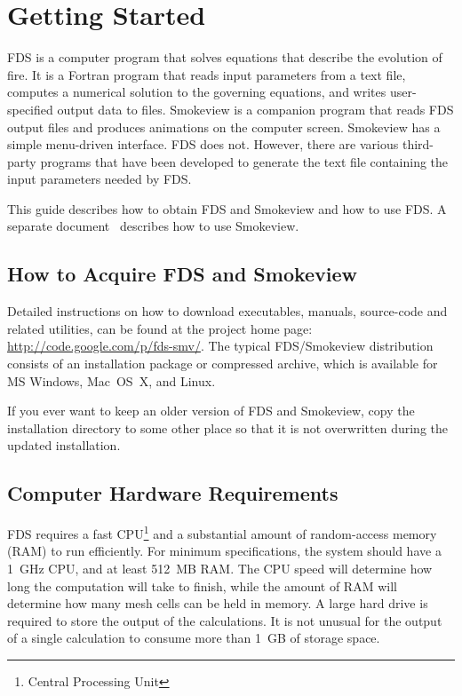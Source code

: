 \documentclass[11pt]{book}
\begin{document}
\chapter{Getting Started}
\label{info:gettingstarted}

FDS is a computer program that solves equations that describe the evolution of fire.
It is a Fortran program that reads input parameters from a text file, computes
a numerical solution to the governing equations, and writes user-specified output data to files.
Smokeview is a companion program that reads FDS output files and produces animations on the computer screen.
Smokeview has a simple menu-driven interface. FDS does not. However, there are various third-party programs
that have been developed to generate the text file containing the input parameters needed by FDS.

This guide describes how to obtain FDS and Smokeview and how to use FDS.
A separate document~\cite{Smokeview_Users_Guide} describes how to use Smokeview.

\section{How to Acquire FDS and Smokeview}
\label{info:acquire}

Detailed instructions on how to download executables, manuals, source-code and related utilities, can be found at the project home page: \href{http://code.google.com/p/fds-smv/}{{\ct http://code.google.com/p/fds-smv/}}. The typical FDS/Smokeview distribution consists of an installation package or compressed archive, which is available for MS Windows, Mac~OS~X, and Linux.

If you ever want to keep an older version of FDS and Smokeview, copy the installation directory to some other place so that it is not overwritten during the updated installation.


\section{Computer Hardware Requirements}

FDS requires a fast CPU\footnote{Central Processing Unit} and a substantial amount of random-access memory (RAM) to run efficiently. For minimum specifications, the system should have a 1~GHz CPU, and at least 512~MB RAM. The CPU speed will determine how long the computation will take to finish, while the amount of RAM will determine how many mesh cells can be held in memory. A large hard drive is required to store the output of the calculations. It is not unusual for the output of a single calculation to consume more than 1~GB of storage space.
\end{document}
